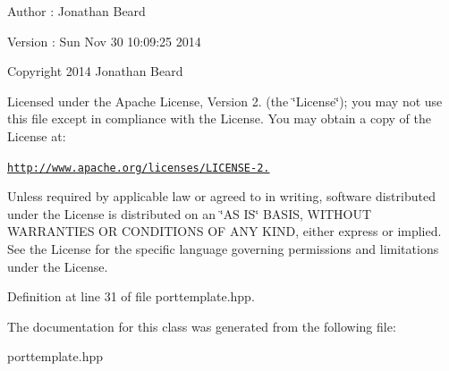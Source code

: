 \begin{DoxyAuthor}{Author}
\+: Jonathan Beard 
\end{DoxyAuthor}
\begin{DoxyVersion}{Version}
\+: Sun Nov 30 10\+:09\+:25 2014
\end{DoxyVersion}
Copyright 2014 Jonathan Beard

Licensed under the Apache License, Version 2. (the \char`\"{}\+License\char`\"{}); you may not use this file except in compliance with the License. You may obtain a copy of the License at\+:

\href{http://www.apache.org/licenses/LICENSE-2.0}{\tt http\+://www.\+apache.\+org/licenses/\+L\+I\+C\+E\+N\+S\+E-\/2.}

Unless required by applicable law or agreed to in writing, software distributed under the License is distributed on an \char`\"{}\+A\+S I\+S\char`\"{} B\+A\+S\+IS, W\+I\+T\+H\+O\+UT W\+A\+R\+R\+A\+N\+T\+I\+ES OR C\+O\+N\+D\+I\+T\+I\+O\+NS OF A\+NY K\+I\+ND, either express or implied. See the License for the specific language governing permissions and limitations under the License. 

Definition at line 31 of file porttemplate.\+hpp.



The documentation for this class was generated from the following file\+:\begin{DoxyCompactItemize}
\item 
porttemplate.\+hpp\end{DoxyCompactItemize}
